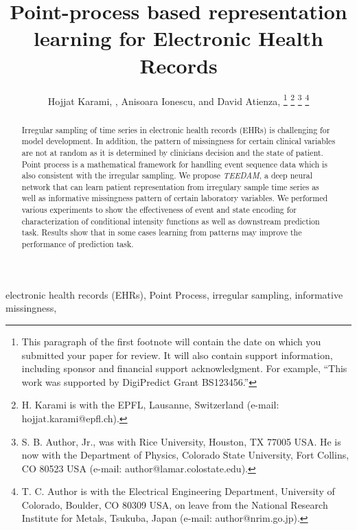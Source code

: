 \documentclass[journal,twoside,web]{ieeecolor}
\begin{document}
\title{Point-process based representation learning for Electronic Health Records}
\author{Hojjat Karami, , Anisoara Ionescu, and David Atienza, 
\thanks{This paragraph of the first footnote will contain the date on 
which you submitted your paper for review. It will also contain support 
information, including sponsor and financial support acknowledgment. For 
example, ``This work was supported by DigiPredict Grant BS123456.'' }
\thanks{H. Karami is with the EPFL, Lausanne, Switzerland (e-mail: hojjat.karami@epfl.ch). }
\thanks{S. B. Author, Jr., was with Rice University, Houston, TX 77005 USA. He is 
now with the Department of Physics, Colorado State University, Fort Collins, 
CO 80523 USA (e-mail: author@lamar.colostate.edu).}
\thanks{T. C. Author is with 
the Electrical Engineering Department, University of Colorado, Boulder, CO 
80309 USA, on leave from the National Research Institute for Metals, 
Tsukuba, Japan (e-mail: author@nrim.go.jp).}}

\maketitle


\begin{abstract}

    Irregular  sampling of time series in electronic health records (EHRs) is challenging for model development. In addition, the pattern of missingness for certain clinical variables are not at random as it is determined by clinicians decision and the state of patient. Point process is a mathematical framework for handling event sequence data which is also consistent with the irregular sampling. We propose \emph{TEEDAM}, a deep neural network that can learn patient representation from irregulary sample time series as well as informative missingness pattern of certain laboratory variables. We performed various experiments to show the effectiveness of event and state encoding for characterization of conditional intensity functions as well as downstream prediction task. Results show that in some cases learning from patterns may improve the performance of prediction task.
\end{abstract}

\begin{IEEEkeywords}
    electronic health records (EHRs), Point Process, irregular sampling, informative missingness,
\end{IEEEkeywords}
\end{document}
